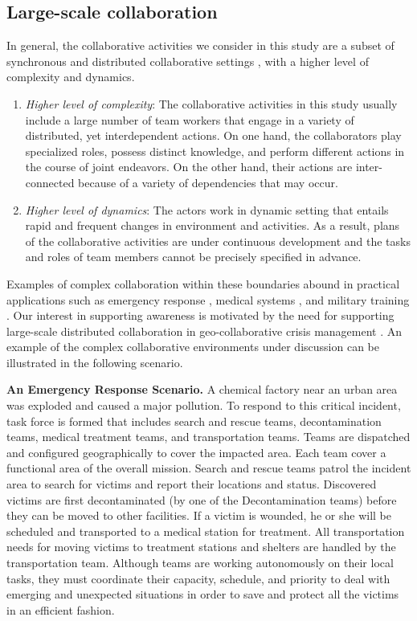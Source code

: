 \subsection{Large-scale collaboration} %
\label{sub:complex_collaboration}
In general, the collaborative activities we consider in this study are a subset of synchronous and distributed collaborative settings \cite{Ellis1991}, with a higher level of complexity and dynamics.

\begin{enumerate}
\item \emph{Higher level of complexity}: The collaborative activities in this study usually include a large number of team workers that engage in a variety of distributed, yet interdependent actions. On one hand, the collaborators play specialized roles, possess distinct knowledge, and perform different actions in the course of joint endeavors. On the other hand, their actions are inter-connected because of a variety of dependencies that may occur. 

\item \emph{Higher level of dynamics}: The actors work in dynamic setting that entails rapid and frequent changes in environment and activities. As a result, plans of the collaborative activities are under continuous development and the tasks and roles of team members cannot be precisely specified in advance.
\end{enumerate}

Examples of complex collaboration within these boundaries abound in practical applications such as emergency response \cite{Turoff2004}, medical systems \cite{Blandford2004}, and military training \cite{mathieu2000influence}. Our interest in supporting awareness is motivated by the need for supporting large-scale distributed collaboration in geo-collaborative crisis management \cite{Cai2005b,Cai2005a}. An example of the complex collaborative environments under discussion can be illustrated in the following scenario.

\begin{scenario}
\textbf{An Emergency Response Scenario.} A chemical factory near an urban area was exploded and caused a major pollution. To respond to this critical incident, task force is formed that includes search and rescue teams, decontamination teams, medical treatment teams, and transportation teams. Teams are dispatched and configured geographically to cover the impacted area. Each team cover a functional area of the overall mission.  Search and rescue teams patrol the incident area to search for victims and report their locations and status. Discovered victims are first decontaminated (by one of the Decontamination teams) before they can be moved to other facilities.  If a victim is wounded, he or she will be scheduled and transported to a medical station for treatment. All transportation needs for moving victims to treatment stations and shelters are handled by the transportation team. Although teams are working autonomously on their local tasks, they must coordinate their capacity, schedule, and priority to deal with emerging and unexpected situations in order to save and protect all the victims in an efficient fashion.
\end{scenario}

